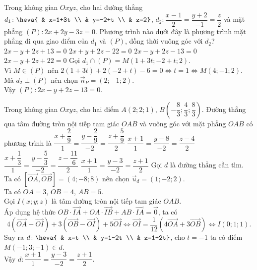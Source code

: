 \begin{ex}%
Trong không gian $Oxyz$, cho hai đường thẳng $d_1\colon \heva{ & x=1+3t \\ & y=-2+t \\ & z=2}$, $d_2\colon \dfrac{x-1}{2}=\dfrac{y+2}{-1}=\dfrac{z}{2}$ và mặt phẳng $(P)\colon 2x+2y-3z=0$. Phương trình nào dưới đây là phương trình mặt phẳng đi qua giao điểm của $d_1$ và $(P)$, đồng thời vuông góc với $d_2$?
\choice
{$2x-y+2z+13=0$}
{$2x+y+2z-22=0$}
{\True $2x-y+2z-13=0$}
{$2x-y+2z+22=0$}
\loigiai
{
Gọi $d_1\cap (P)=M(1+3t;-2+t;2)$.\\
Vì $M\in (P)$ nên $2(1+3t)+2(-2+t)-6=0\Leftrightarrow t=1 \Leftrightarrow M(4;-1;2)$.\\
Mà $d_2\perp (P)$ nên chọn $\overrightarrow{n}_{P}=(2;-1;2)$.\\
Vậy $(P)\colon 2x-y+2z-13=0$.
}
\end{ex}

\begin{ex}%
Trong không gian $Oxyz$, cho hai điểm $A(2;2;1)$, $B\left(-\dfrac{8}{3};\dfrac{4}{3};\dfrac{8}{3}\right)$. Đường thẳng qua tâm đường tròn nội tiếp tam giác $OAB$ và vuông góc với mặt phẳng $OAB$ có phương trình là
\choice
{$\dfrac{x+\dfrac{2}{9}}{1}=\dfrac{y-\dfrac{2}{9}}{-2}=\dfrac{z+\dfrac{5}{9}}{2}$}
{$\dfrac{x+1}{1}=\dfrac{y-8}{-2}=\dfrac{z-4}{2}$}
{$\dfrac{x+\dfrac{1}{3}}{1}=\dfrac{y-\dfrac{5}{3}}{-2}=\dfrac{z-\dfrac{11}{6}}{2}$}
{\True $\dfrac{x+1}{1}=\dfrac{y-3}{-2}=\dfrac{z+1}{2}$}
\loigiai
{
Gọi $d$ là đường thẳng cần tìm.\\
Ta có $\left[\overrightarrow{OA},\overrightarrow{OB}\right]=(4;-8;8)$ nên chọn $\overrightarrow{u}_{d}=(1;-2;2)$.\\
Ta có $OA=3$, $OB=4$, $AB=5$.\\
Gọi $I(x;y;z)$ là tâm đường tròn nội tiếp tam giác $OAB$.\\
Áp dụng hệ thức $OB\cdot\overrightarrow{IA}+OA\cdot\overrightarrow{IB}+AB\cdot\overrightarrow{IA}=\overrightarrow{0}$, ta có
$$4\left(\overrightarrow{OA}-\overrightarrow{OI}\right)+3\left(\overrightarrow{OB}-\overrightarrow{OI}\right)+5\overrightarrow{OI}\Leftrightarrow \overrightarrow{OI}=\dfrac{1}{12}\left(4\overrightarrow{OA}+3\overrightarrow{OB}\right)\Leftrightarrow I(0;1;1).$$
Suy ra $d\colon \heva{ & x=t \\ & y=1-2t \\ & z=1+2t}$, cho $t=-1$ ta có điểm $M(-1;3;-1)\in d$.\\
Vậy $d\colon \dfrac{x+1}{1}=\dfrac{y-3}{-2}=\dfrac{z+1}{2}$.
}
\end{ex}

